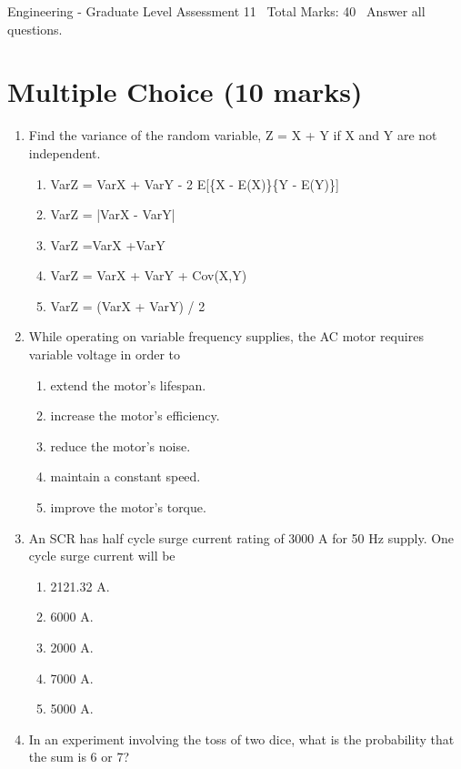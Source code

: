 \documentclass[12pt]{article}
\begin{document}
\begin{center}
Engineering - Graduate Level Assessment 11 \
Total Marks: 40 \
Answer all questions.
\end{center}

\section*{Multiple Choice (10 marks)}
\begin{enumerate}[label=\arabic*.]
\item Find the variance of the random variable, Z = X + Y if X and Y are not independent.
\begin{enumerate}[label=(\alph*)]
    \item VarZ = VarX + VarY - 2 E[\{X - E(X)\}\{Y - E(Y)\}]
    \item VarZ = |VarX - VarY|
    \item VarZ =VarX +VarY
    \item VarZ = VarX + VarY + Cov(X,Y)
    \item VarZ = (VarX + VarY) / 2
\end{enumerate}
\item While operating on variable frequency supplies, the AC motor requires variable voltage in order to
\begin{enumerate}[label=(\alph*)]
    \item extend the motor's lifespan.
    \item increase the motor's efficiency.
    \item reduce the motor's noise.
    \item maintain a constant speed.
    \item improve the motor's torque.
\end{enumerate}
\item An SCR has half cycle surge current rating of 3000 A for 50 Hz supply. One cycle surge current will be
\begin{enumerate}[label=(\alph*)]
    \item 2121.32 A.
    \item 6000 A.
    \item 2000 A.
    \item 7000 A.
    \item 5000 A.
\end{enumerate}
\item In an experiment involving the toss of two dice, what is the probability that the sum is 6 or 7?
\begin{enumerate}[label=(\alph*)]

\end{enumerate}
\end{enumerate}
\end{document}
